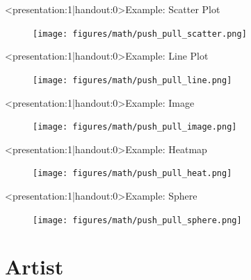 \documentclass[xcolor={dvipsnames}, handout]{beamer}
\begin{document}
\begin{frame}<presentation:1|handout:0>{Example: Scatter Plot}
    \begin{figure}
        \texttt{[image: figures/math/push\_pull\_scatter.png]}
    \end{figure}
\end{frame}

\begin{frame}<presentation:1|handout:0>{Example: Line Plot}
    \begin{figure}
        \texttt{[image: figures/math/push\_pull\_line.png]}
    \end{figure}
\end{frame}

\begin{frame}<presentation:1|handout:0>{Example: Image}
    \begin{figure}
        \texttt{[image: figures/math/push\_pull\_image.png]}
    \end{figure}
\end{frame}

\begin{frame}<presentation:1|handout:0>{Example: Heatmap}
    \begin{figure}
        \texttt{[image: figures/math/push\_pull\_heat.png]}
    \end{figure}
\end{frame}

\begin{frame}<presentation:1|handout:0>{Example: Sphere}
    \begin{figure}
        \texttt{[image: figures/math/push\_pull\_sphere.png]}
    \end{figure}
\end{frame}


\section{Artist}
\end{document}
